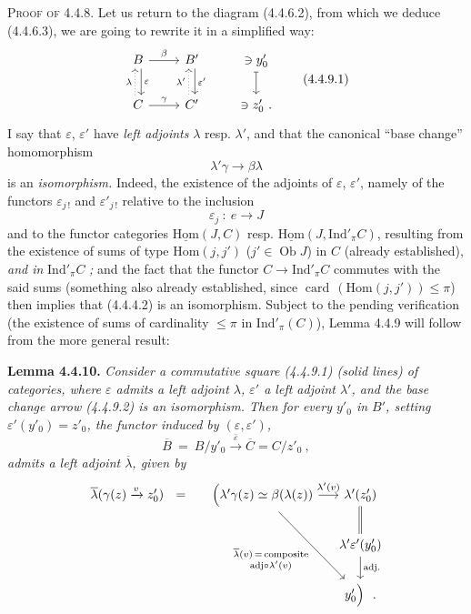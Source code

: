 \documentclass[11pt]{article}
\newcommand{\printedpage}[1]{\marginpar{\footnotesize p.~#1}}
\newcommand{\msp}[1]{\marginpar{\footnotesize [#1]}}
\newcommand{\uHom}{\underline{\mathrm{Hom}}}
\newcommand{\Hom}{\mathrm{Hom}}
\newcommand{\Ind}{\mathrm{Ind}}
\newcommand{\Ob}{\operatorname{Ob}}
\newcommand{\card}{\operatorname{card}}
\begin{document}
\msp{page 90}
\textsc{Proof of} 4.4.8. Let us return to the diagram (4.4.6.2), from which we deduce (4.4.6.3), we are going to rewrite it in a simplified way:
\[
\begin{tikzcd}
B \arrow[r, "\beta"] \arrow[d, shift left, "\varepsilon"] & B' \arrow[d, shift left, "\varepsilon'"] & \ni y'_0 \arrow[d, mapsto] \\
C \arrow[r, "\gamma"] \arrow[u, dotted, shift left, "\lambda"] & C' \arrow[u, dotted, shift left, "\lambda'"] & \ni z'_0\ .
\end{tikzcd}
\tag*{(4.4.9.1)}
\]
I say that $\varepsilon$, $\varepsilon'$ have \textit{left adjoints} $\lambda$ resp. $\lambda'$, and that the canonical ``base change'' homomorphism
\[
\lambda'\gamma \longrightarrow \beta\lambda \tag*{(4.4.9.2)}
\]
is an \textit{isomorphism.} Indeed, the existence of the adjoints of $\varepsilon$, $\varepsilon'$, namely of the functors $\varepsilon_{j\,!}$ and $\varepsilon'_{j\,!}$ relative to the inclusion
\[
\varepsilon_j \ :\ e \longrightarrow J
\]
and to the functor categories $\uHom(J,C)$ resp. $\uHom(J,\Ind'_\pi C)$, resulting from the existence of sums of type $\Hom(j,j')$ ($j' \in \Ob J$) in $C$ (already established), \textit{and in} $\Ind'_\pi C$\textit{ ;} and the fact that the functor $C \longrightarrow \Ind'_\pi C$ commutes
\msp{page 91}
with the said sums (something also already established, since $\card\, (\Hom(j,j')) \leqslant \pi$) then implies that (4.4.4.2) is an isomorphism. Subject to the pending verification (the existence %
\printedpage{22}
of sums of cardinality $\leqslant \pi$ in $\Ind'_\pi(C)$), Lemma 4.4.9 will follow from the more general result:

\textbf{Lemma 4.4.10.} \textit{Consider a commutative square (4.4.9.1) (solid lines) of categories, where $\varepsilon$ admits a left adjoint $\lambda$, $\varepsilon'$ a left adjoint $\lambda'$, and the base change arrow (4.4.9.2) is an isomorphism. Then for every $y'_0$ in $B'$, setting $\varepsilon'(y'_0) = z'_0$, the functor induced by $(\varepsilon, \varepsilon')$,}
\[
\overline{B} \ =\ B/y'_0 \xrightarrow{\bar{\varepsilon}} \overline{C} = C/z'_0\ ,
\]
\textit{admits a left adjoint $\overline{\lambda}$, given by}
\[
\begin{tikzcd}[column sep=small]
\overline{\lambda}(\gamma(z) \xrightarrow{v} z'_0) \ \ = & \Bigl(\lambda'\gamma(z) \simeq \beta(\lambda(z)) \arrow[r, "{\lambda'(v)}"] \arrow[ddr, "{\substack{\overline{\lambda}(v) \,=\, \text{composite}\\ \text{adj} \circ \lambda'(v)}}"'] & \lambda'(z'_0) \arrow[d, equal] \\
 & & \lambda'\varepsilon'(y'_0) \arrow[d, "\text{adj.}"] \\
 & & y'_0\Bigr)\ \ .
\end{tikzcd}
\]
\end{document}
